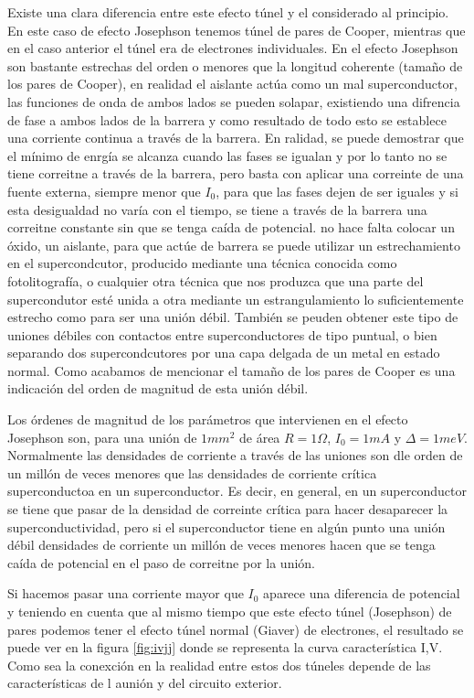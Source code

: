 Existe una clara diferencia entre este efecto túnel y el considerado al principio. En este caso de efecto Josephson tenemos túnel de pares de Cooper, mientras que en el caso anterior el túnel era de electrones individuales. En el efecto Josephson son bastante estrechas del orden o menores que la longitud coherente (tamaño de los pares de Cooper), en realidad el aislante actúa como un mal superconductor, las funciones de onda de ambos lados se pueden solapar, existiendo una difrencia de fase a ambos lados de la barrera y como resultado de todo esto se establece una corriente continua a través de la barrera. En ralidad, se puede demostrar que el mínimo de enrgía se alcanza cuando las fases se igualan y por lo tanto no se tiene correitne a través de la barrera, pero basta con aplicar una correinte de una fuente externa, siempre menor que $I_0$, para que las fases dejen de ser iguales y si esta desigualdad no varía con el tiempo, se tiene a través de la barrera una correitne constante sin que se tenga caída de potencial. no hace falta colocar un óxido, un aislante, para que actúe de barrera se puede utilizar un estrechamiento en el supercondcutor, producido mediante una técnica conocida como fotolitografía, o cualquier otra técnica que nos produzca que una parte del supercondutor esté unida a otra mediante un estrangulamiento lo suficientemente estrecho como para ser una unión débil. También se peuden obtener este tipo de uniones débiles con contactos entre superconductores de tipo puntual, o bien separando dos supercondcutores por una capa delgada de un metal en estado normal. Como acabamos de mencionar el tamaño de los pares de Cooper es una indicación del orden de magnitud de esta unión débil.

Los órdenes de magnitud de los parámetros que intervienen en el efecto Josephson son, para una unión de $1mm^2$ de área $R = 1 \Omega$, $I_0 = 1 mA$ y $\Delta = 1meV$. Normalmente las densidades de corriente a través de las uniones son dle orden de un millón de veces menores que las densidades de corriente crítica superconductoa en un superconductor. Es decir, en general, en un superconductor se tiene que pasar de la densidad de correinte crítica para hacer desaparecer la superconductividad, pero si el superconductor tiene en algún punto una unión débil densidades de corriente un millón de veces menores hacen que se tenga caída de potencial en el paso de correitne por la unión.

Si hacemos pasar una corriente mayor que $I_0$ aparece una diferencia de potencial y teniendo en cuenta que al mismo tiempo que este efecto túnel (Josephson) de pares podemos tener el efecto túnel normal (Giaver) de electrones, el resultado se puede ver en la figura \ref{fig:ivjj} donde se representa la curva característica I,V. Como sea la conexción en la realidad entre estos dos túneles depende de las características de l aunión y del circuito exterior.

